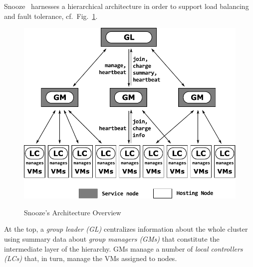 

Snooze~\cite{snoozeweb,feller:ccgrid12} harnesses a hierarchical
architecture in order to support load balancing and fault tolerance,
cf.\ Fig.~\ref{fig:snoozearch}.

\begin{figure}
  {\centering
\vspace*{-.6cm}
\includegraphics[width=.97\linewidth]{figures/snoozearch.pdf}}
\vspace*{-.5cm}
  \caption{Snooze's Architecture Overview}
  \label{fig:snoozearch}
\vspace*{-.5cm}
\end{figure}
At the top, %
 a \emph{group leader (GL)} centralizes information about the whole
cluster using summary data about \emph{group managers (GMs)} that
constitute the intermediate layer of the hierarchy. GMs manage a
number of \emph{local controllers (LCs)} that, in turn, manage the VMs
assigned to nodes.

